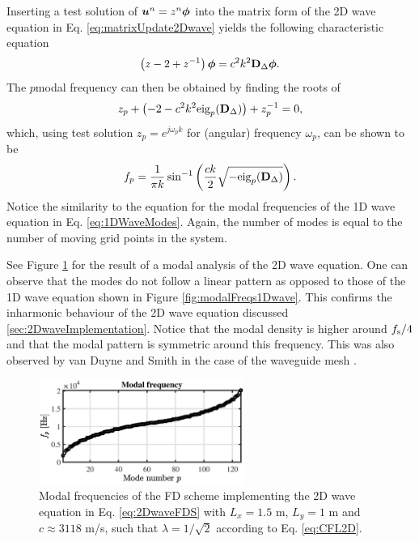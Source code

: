 Inserting a test solution of $\boldsymbol{u}^n = z^n\boldsymbol{\phi}$ into the matrix form of the 2D wave equation in Eq. \eqref{eq:matrixUpdate2Dwave} yields the following characteristic equation
\begin{equation}
   \left(z - 2 + z^{-1}\right)\boldsymbol{\phi} = c^2k^2\mathbf{D}_\Delta\boldsymbol{\phi}.
\end{equation}
The $p$\th modal frequency can then be obtained by finding the roots of 
\begin{equation}
    z_p + \left(-2 - c^2k^2\text{eig}_p(\mathbf{D}_\Delta)\right) + z_p^{-1} = 0,
\end{equation}
which, using test solution $z_p = e^{j\omega_p k}$ for (angular) frequency $\omega_p$, can be shown to be 
\begin{equation}\label{eq:2DWaveModes}
    f_p = \frac{1}{\pi k}\sin^{-1}\left(\frac{ck}{2}\sqrt{-\text{eig}_p(\mathbf{D}_\Delta)}\right).
\end{equation}
Notice the similarity to the equation for the modal frequencies of the 1D wave equation in Eq. \eqref{eq:1DWaveModes}. Again, the number of modes is equal to the number of moving grid points in the system. 

See Figure \ref{fig:modalFreqs2Dwave} for the result of a modal analysis of the 2D wave equation. One can observe that the modes do not follow a linear pattern as opposed to those of the 1D wave equation shown in Figure \ref{fig:modalFreqs1Dwave}. This confirms the inharmonic behaviour of the 2D wave equation discussed \ref{sec:2DwaveImplementation}. Notice that the modal density is higher around $f_\text{s}/4$ and that the modal pattern is symmetric around this frequency. This was also observed by van Duyne and Smith in the case of the waveguide mesh \cite{Duyne1993}.
\begin{figure}[h]
    \centering
    \includegraphics[width = 0.6\textwidth]{figures/resonators/2d/modes2Dwave.eps}
    \caption{Modal frequencies of the FD scheme implementing the 2D wave equation in Eq. \eqref{eq:2DwaveFDS} with $L_x = 1.5$ m, $L_y = 1$ m and $c\approx 3118$ m/s, such that $\lambda = 1/\sqrt{2}$ according to Eq. \eqref{eq:CFL2D}. \label{fig:modalFreqs2Dwave}}
\end{figure}
